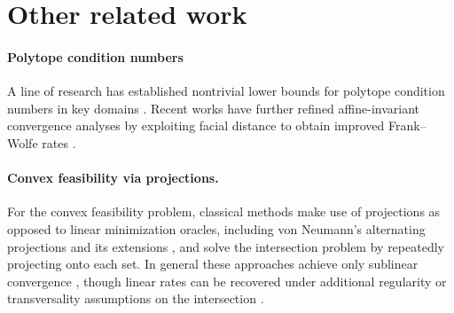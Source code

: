 \documentclass{article}
\newif\ifTODO
\newcommand{\Eli}[1]{\ifTODO \todo[inline,author=EW, caption={}, color=magenta]{#1} \fi}
\newcommand\newlink[2]{\hyperlink{#1}{\normalcolor #2}}
\newcommand{\FW}{\newlink{def:acronym_frank_wolfe}{FW}}
\newcommand{\LMO}{\newlink{def:acronym_linear_minimization_oracle}{LMO}}
\begin{document}
%
%
%
%
%
%
%
%
%
%
%
%
%
%
%
%
%
%
%
%
\section{Other related work} \label{s:literature}

\paragraph{Polytope condition numbers}
A line of research has established nontrivial lower bounds for polytope condition numbers in key domains \cite{wirth2023approximate,CFK23}. Recent works have further refined affine-invariant convergence analyses by exploiting facial distance to obtain improved Frank–Wolfe rates \cite{wirth2025accelerated,pena2023affine}.

\paragraph{Convex feasibility via projections.}
For the convex feasibility problem, classical methods make use of projections as opposed to linear minimization oracles, including von Neumann’s alternating projections and its extensions \cite{Von49,Gin18}, and solve the intersection problem by repeatedly projecting onto each set. In general these approaches achieve only sublinear convergence \cite{BS16,BC11,BPW23}, though linear rates can be recovered under additional regularity or transversality assumptions on the intersection \cite{GPR67,BB93,BB96,BT03,DIL15,BLM21,BBS21}.
\end{document}
